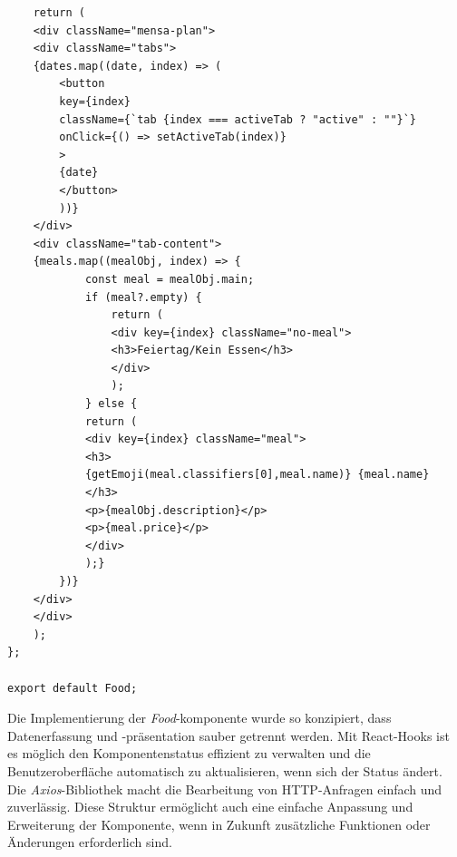 \begin{lstlisting}
    return (
    <div className="mensa-plan">
    <div className="tabs">
    {dates.map((date, index) => (
        <button
        key={index}
        className={`tab {index === activeTab ? "active" : ""}`}
        onClick={() => setActiveTab(index)}
        >
        {date}
        </button>
        ))}
    </div>
    <div className="tab-content">
    {meals.map((mealObj, index) => {
            const meal = mealObj.main;
            if (meal?.empty) {
                return (
                <div key={index} className="no-meal">
                <h3>Feiertag/Kein Essen</h3>
                </div>
                );
            } else {
            return (
            <div key={index} className="meal">
            <h3>
            {getEmoji(meal.classifiers[0],meal.name)} {meal.name}
            </h3>
            <p>{mealObj.description}</p>
            <p>{meal.price}</p>
            </div>
            );}
        })}
    </div>
	</div>
	);
};

export default Food;

\end{lstlisting}

Die Implementierung der \emph{Food}-komponente wurde so konzipiert, dass Datenerfassung und -präsentation sauber getrennt werden. Mit React-Hooks ist es möglich den Komponentenstatus effizient zu verwalten und die Benutzeroberfläche automatisch zu aktualisieren, wenn sich der Status ändert. Die \emph{Axios}-Bibliothek macht die Bearbeitung von HTTP-Anfragen einfach und zuverlässig. Diese Struktur ermöglicht auch eine einfache Anpassung und Erweiterung der Komponente, wenn in Zukunft zusätzliche Funktionen oder Änderungen erforderlich sind.

